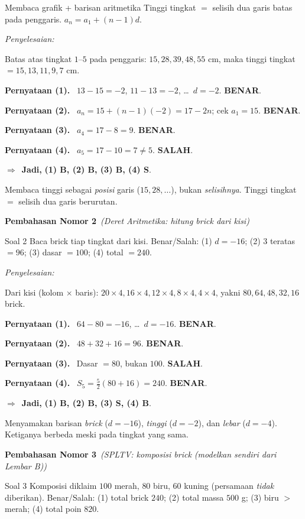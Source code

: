 \documentclass[11pt,a4paper]{article}
\newcommand{\jawab}{\par\smallskip\noindent\textit{\textcolor{oranye}{Penyelesaian:}}\par\smallskip}
\newcommand{\jadi}{\par\smallskip\noindent$\Rightarrow$\ \textbf{Jadi, }}
\newcommand{\benar}{\textbf{\textcolor{hijau}{BENAR}}}
\newcommand{\salah}{\textbf{\textcolor{merah}{SALAH}}}
\newcommand{\pernyataan}[1]{\par\smallskip\noindent\textbf{Pernyataan (#1).}\ }
\newcommand{\nomorjudul}[2]{\par\bigskip\noindent%
  {\large\bfseries\color{ungu}Pembahasan Nomor #1}\ {\normalfont\itshape\color{gray}(#2)}\par\nopagebreak\smallskip}
\begin{document}
\begin{ingat}{Membaca grafik + barisan aritmetika}
Tinggi tingkat $=$ selisih dua garis batas pada penggaris. $a_n=a_1+(n-1)d$.
\end{ingat}

\jawab
Batas atas tingkat $1$--$5$ pada penggaris: $15,28,39,48,55$ cm, maka tinggi
tingkat $=15,13,11,9,7$ cm.

\pernyataan{1} $13-15=-2$, $11-13=-2$, \dots\ $d=-2$. \benar.

\pernyataan{2} $a_n=15+(n-1)(-2)=17-2n$; cek $a_1=15$. \benar.

\pernyataan{3} $a_4=17-8=9$. \benar.

\pernyataan{4} $a_5=17-10=7\neq5$. \salah.

\jadi \textbf{(1) B, (2) B, (3) B, (4) S}.

\begin{jebakan}
Membaca tinggi sebagai \emph{posisi} garis ($15,28,\ldots$), bukan
\emph{selisihnya}. Tinggi tingkat $=$ selisih dua garis berurutan.
\end{jebakan}

\nomorjudul{2}{Deret Aritmetika: hitung brick dari kisi}
\begin{soalbox}{Soal 2}
Baca brick tiap tingkat dari kisi. Benar/Salah: (1) $d=-16$; (2) $3$ teratas $=96$;
(3) dasar $=100$; (4) total $=240$.
\end{soalbox}

\jawab
Dari kisi (kolom $\times$ baris): $20\times4,16\times4,12\times4,8\times4,4\times4$,
yakni $80,64,48,32,16$ brick.

\pernyataan{1} $64-80=-16$, \dots\ $d=-16$. \benar.

\pernyataan{2} $48+32+16=96$. \benar.

\pernyataan{3} Dasar $=80$, bukan $100$. \salah.

\pernyataan{4} $S_5=\tfrac{5}{2}(80+16)=240$. \benar.

\jadi \textbf{(1) B, (2) B, (3) S, (4) B}.

\begin{jebakan}
Menyamakan barisan \emph{brick} ($d=-16$), \emph{tinggi} ($d=-2$), dan
\emph{lebar} ($d=-4$). Ketiganya berbeda meski pada tingkat yang sama.
\end{jebakan}

\nomorjudul{3}{SPLTV: komposisi brick (modelkan sendiri dari Lembar B)}
\begin{soalbox}{Soal 3}
Komposisi diklaim $100$ merah, $80$ biru, $60$ kuning (persamaan \emph{tidak}
diberikan). Benar/Salah: (1) total brick $240$; (2) total massa $500$ g;
(3) biru $>$ merah; (4) total poin $820$.
\end{soalbox}
\end{document}
